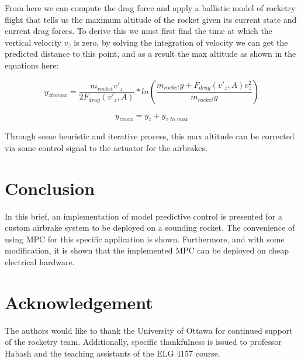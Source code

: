 \documentclass[conference, letterpaper]{IEEEtran}
\begin{document}
From here we can compute the drag force and apply a ballistic model of rocketry flight that tells us
the maximum altitude of the rocket given its current state and current drag forces. To derive this
we must first find the time at which the vertical velocity $v_{z}$ is zero, by solving the integration of velocity
we can get the predicted distance to this point, and as a result the max altitude as shown in the equations here:

\begin{equation} \label{eq:drag_model_airbrakes}
  y_{z to max} = \frac{m_{rocket}v'_z}{2F_{drag}(v'_z, A)}*ln(\frac{m_{rocket}g+F_{drag}(v'_z, A)v_z^2}{m_{rocket}g})
\end{equation}

\begin{equation} \label{eq:final_alt_dynamics}
  y_{z max} = y_z + y_{z\_to\_max}
\end{equation}

Through some heuristic and iterative process, this max altitude can be corrected
via some control signal to the actuator for the airbrakes.

\section{Conclusion}

In this brief, an implementation of model predictive control is presented for a
custom airbrake system to be deployed on a sounding rocket. The convenience of
using MPC for this specific application is shown. Furthermore, and with some
modification, it is shown that the implemented MPC can be deployed on cheap electrical
hardware.

\section{Acknowledgement}

The authors would like to thank the University of Ottawa for continued support of the
rocketry team. Additionally, specific thankfulness is issued to professor Habash and
the teaching assistants of the ELG 4157 course.



\end{document}
